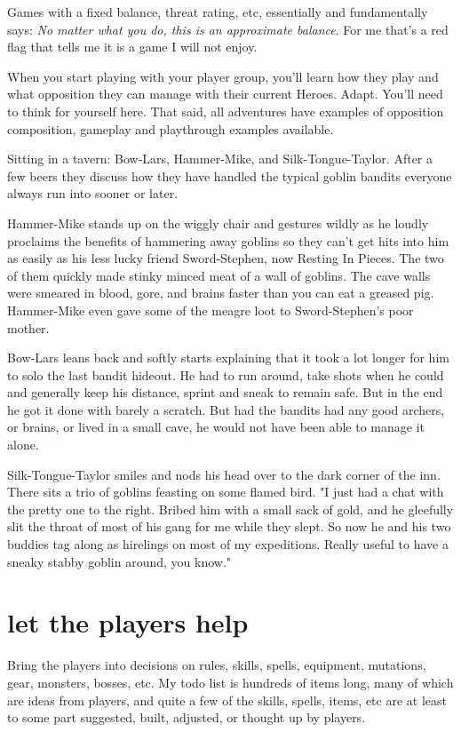 Games with a fixed balance, threat rating, etc, essentially and fundamentally says: \emph{No matter what you do, this is an approximate balance}. For me that's a red flag that tells me it is a game I will not enjoy.

When you start playing with your player group, you'll learn how they play and what opposition they can manage with their current Heroes. Adapt. You'll need to think for yourself here. That said, all adventures have examples of opposition composition, gameplay and playthrough examples available.

\begin{readoutloud}
Sitting in a tavern: Bow-Lars, Hammer-Mike, and Silk-Tongue-Taylor. After a few beers they discuss how they have handled the typical goblin bandits everyone always run into sooner or later.

Hammer-Mike stands up on the wiggly chair and gestures wildly as he loudly proclaims the benefits of hammering away goblins so they can't get hits into him as easily as his less lucky friend Sword-Stephen, now Resting In Pieces. The two of them quickly made stinky minced meat of a wall of goblins. The cave walls were smeared in blood, gore, and brains faster than you can eat a greased pig. Hammer-Mike even gave some of the meagre loot to Sword-Stephen's poor mother.

Bow-Lars leans back and softly starts explaining that it took a lot longer for him to solo the last bandit hideout. He had to run around, take shots when he could and generally keep his distance, sprint and sneak to remain safe. But in the end he got it done with barely a scratch. But had the bandits had any good archers, or brains, or lived in a small cave, he would not have been able to manage it alone.

Silk-Tongue-Taylor smiles and nods his head over to the dark corner of the inn. There sits a trio of goblins feasting on some flamed bird. "I just had a chat with the pretty one to the right. Bribed him with a small sack of gold, and he gleefully slit the throat of most of his gang for me while they slept. So now he and his two buddies tag along as hirelings on most of my expeditions. Really useful to have a sneaky stabby goblin around, you know."
\end{readoutloud}


\section*{let the players help}
Bring the players into decisions on rules, skills, spells, equipment, mutations, gear, monsters, bosses, etc. My todo list is hundreds of items long, many of which are ideas from players, and quite a few of the skills, spells, items, etc are at least to some part suggested, built, adjusted, or thought up by players.

